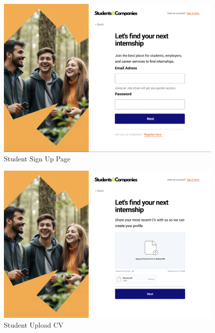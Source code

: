 \documentclass[a4paper,12pt]{article}
\begin{document}
\begin{figure}[H]
    \centering
    \includegraphics[scale = 0.45]{figures/UserInterfaces/General/StudentSignUp.png}
    \caption{Student Sign Up Page}
    \centering
\end{figure}
\begin{figure}[H]
    \centering
    \includegraphics[scale = 0.42]{figures/UserInterfaces/General/StudentUploadCV.png}
    \caption{Student Upload CV}
    \centering
\end{figure}
\end{document}
